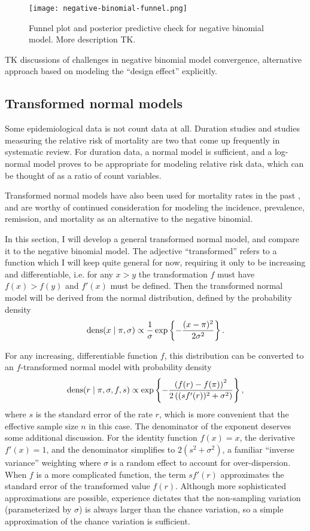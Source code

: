 \begin{figure}[ht]
\begin{center}
\texttt{[image: negative-binomial-funnel.png]}

\end{center}
\caption{Funnel plot and posterior predictive check for negative
  binomial model. More description
  TK.} \label{rate-model-negative-binomial-funnel}
\end{figure}

TK discussions of challenges in negative binomial model convergence,
alternative approach based on modeling the ``design effect''
explicitly.

\subsection{Transformed normal models}
\label{transformed-normal-models}
Some epidemiological data is not count data at all.  Duration studies
and studies measuring the relative risk of mortality are two that come
up frequently in systematic review.  For duration data, a normal model
is sufficient, and a log-normal model proves to be appropriate for
modeling relative risk data, which can be thought of as a ratio of
count variables.

Transformed normal models have also been used for mortality rates in
the past \cite{Girotsis and King-Demographic Forecasting Book}, and
are worthy of continued consideration for modeling the incidence,
prevalence, remission, and mortality as an alternative to the negative
binomial.

In this section, I will develop a general transformed normal model,
and compare it to the negative binomial model.  The adjective
``transformed'' refers to a function which I will keep quite general
for now, requiring it only to be increasing and differentiable,
i.e. for any $x > y$ the transformation $f$ must have $f(x) > f(y)$
and $f'(x)$ must be defined.  Then the transformed normal model will
be derived from the normal distribution, defined by the probability
density
\[
\operatorname{dens}(x\;|\; \pi, \sigma)
 \propto \frac{1}{\sigma}
\exp\left\{ -\frac{(x-\pi)^2}{2\sigma^2} \right\}.
\]

For any increasing, differentiable function $f$, this distribution can
be converted to an $f$-transformed normal model with probability
density
\[
\operatorname{dens}(r \;|\; \pi, \sigma, f, s) \propto
\exp\left\{-\frac{\left(f(r)-f(\pi)\right)^2}{2\left((sf'(r))^2+\sigma^2\right)}\right\},
\]
where $s$ is the standard error of the rate $r$, which is more
convenient that the effective sample size $n$ in this case. The
denominator of the exponent deserves some additional discussion.  For
the identity function $f(x) = x$, the derivative $f'(x) = 1$, and the
denominator simplifies to $2(s^2 + \sigma^2)$, a familiar ``inverse
variance'' weighting where $\sigma$ is a random effect to account for
over-dispersion.  When $f$ is a more complicated function, the term
$sf'(r)$ approximates the standard error of the transformed value
$f(r)$.  Although more sophisticated approximations are possible,
experience dictates that the non-sampling variation (parameterized by
$\sigma$) is always larger than the chance variation, so a simple
approximation of the chance variation is sufficient.

